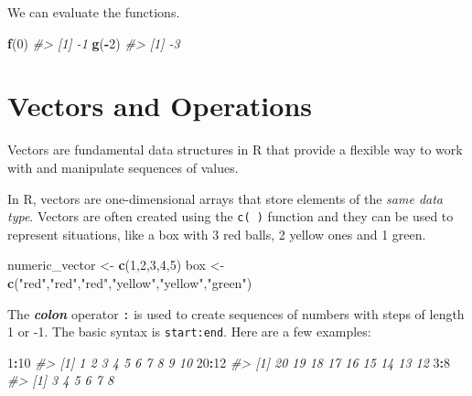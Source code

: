 \documentclass[
]{book}
\newenvironment{Shaded}{\begin{snugshade}}{\end{snugshade}}
\newcommand{\CommentTok}[1]{\textcolor[rgb]{0.56,0.35,0.01}{\textit{#1}}}
\newcommand{\DecValTok}[1]{\textcolor[rgb]{0.00,0.00,0.81}{#1}}
\newcommand{\FunctionTok}[1]{\textcolor[rgb]{0.13,0.29,0.53}{\textbf{#1}}}
\newcommand{\NormalTok}[1]{#1}
\newcommand{\OtherTok}[1]{\textcolor[rgb]{0.56,0.35,0.01}{#1}}
\newcommand{\SpecialCharTok}[1]{\textcolor[rgb]{0.81,0.36,0.00}{\textbf{#1}}}
\newcommand{\StringTok}[1]{\textcolor[rgb]{0.31,0.60,0.02}{#1}}
\theoremstyle{definition}
\theoremstyle{definition}
\theoremstyle{definition}
\theoremstyle{definition}
\theoremstyle{remark}
\begin{document}
We can evaluate the functions.

\begin{Shaded}
\begin{Highlighting}[]
\FunctionTok{f}\NormalTok{(}\DecValTok{0}\NormalTok{)}
\CommentTok{\#\textgreater{} [1] {-}1}
\FunctionTok{g}\NormalTok{(}\SpecialCharTok{{-}}\DecValTok{2}\NormalTok{)}
\CommentTok{\#\textgreater{} [1] {-}3}
\end{Highlighting}
\end{Shaded}

\hypertarget{vectors-and-operations}{%
\section{Vectors and Operations}\label{vectors-and-operations}}

Vectors are fundamental data structures in R that provide a flexible way to work with and manipulate sequences of values.

In R, vectors are one-dimensional arrays that store elements of the \emph{same data type}. Vectors are often created using the \texttt{c(\ )} function and they can be used to represent situations, like a box with 3 red balls, 2 yellow ones and 1 green.

\begin{Shaded}
\begin{Highlighting}[]
\NormalTok{numeric\_vector }\OtherTok{\textless{}{-}} \FunctionTok{c}\NormalTok{(}\DecValTok{1}\NormalTok{,}\DecValTok{2}\NormalTok{,}\DecValTok{3}\NormalTok{,}\DecValTok{4}\NormalTok{,}\DecValTok{5}\NormalTok{)}
\NormalTok{box }\OtherTok{\textless{}{-}} \FunctionTok{c}\NormalTok{(}\StringTok{"red"}\NormalTok{,}\StringTok{"red"}\NormalTok{,}\StringTok{"red"}\NormalTok{,}\StringTok{"yellow"}\NormalTok{,}\StringTok{"yellow"}\NormalTok{,}\StringTok{"green"}\NormalTok{)}
\end{Highlighting}
\end{Shaded}

The \textbf{\emph{colon}} operator \texttt{:} is used to create sequences of numbers with steps of length 1 or -1. The basic syntax is \texttt{start:end}. Here are a few examples:

\begin{Shaded}
\begin{Highlighting}[]
\DecValTok{1}\SpecialCharTok{:}\DecValTok{10}
\CommentTok{\#\textgreater{}  [1]  1  2  3  4  5  6  7  8  9 10}
\DecValTok{20}\SpecialCharTok{:}\DecValTok{12}
\CommentTok{\#\textgreater{} [1] 20 19 18 17 16 15 14 13 12}
\DecValTok{3}\SpecialCharTok{:}\DecValTok{8}
\CommentTok{\#\textgreater{} [1] 3 4 5 6 7 8}
\end{Highlighting}
\end{Shaded}
\end{document}
